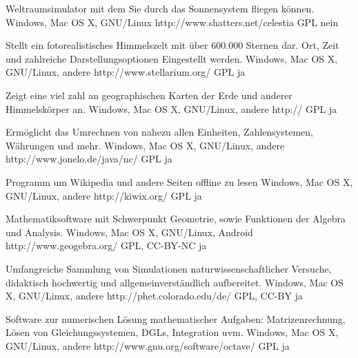 \documentclass[11pt,a4paper,landscape,twocolumn]{article}
\begin{document}


{Weltraumsimulator mit dem Sie durch das Sonnensystem fliegen können.}
{Windows, Mac OS X, GNU/Linux}
{http://www.shatters.net/celestia}
{GPL}
{nein}

{Stellt ein fotorealistisches Himmelszelt mit über 600.000 Sternen dar. Ort, Zeit und zahlreiche Darstellungsoptionen Eingestellt werden.}
{Windows, Mac OS X, GNU/Linux, andere}
{http://www.stellarium.org/}
{GPL}
{ja}

{Zeigt eine viel zahl an geographischen Karten der Erde und anderer Himmelskörper an.}
{Windows, Mac OS X, GNU/Linux, andere}
{http://}
{GPL}
{ja}

{Ermöglicht das Umrechnen von nahezu allen Einheiten, Zahlensystemen, Währungen und mehr.}
{Windows, Mac OS X, GNU/Linux, andere}
{http://www.jonelo.de/java/nc/}
{GPL}
{ja}

\newpage %

{Programm um Wikipedia und andere Seiten offline zu lesen}
{Windows, Mac OS X, GNU/Linux, andere}
{http://kiwix.org/}
{GPL}
{ja}

{Mathematiksoftware mit Schwerpunkt Geometrie, sowie Funktionen der Algebra und Analysis.}
{Windows, Mac OS X, GNU/Linux, Android}
{http://www.geogebra.org/}
{GPL, CC-BY-NC}
{ja}

{Umfangreiche Sammlung von Simulationen naturwissenschaftlicher Versuche, didaktisch hochwertig und allgemeinverständlich aufbereitet.}
{Windows, Mac OS X, GNU/Linux, andere}
{http://phet.colorado.edu/de/}
{GPL, CC-BY}
{ja}

{Software zur numerischen Lösung mathematischer Aufgaben: Matrizenrechnung, Lösen von Gleichungssystemen, DGLs, Integration uvm.}
{Windows, Mac OS X, GNU/Linux, andere}
{http://www.gnu.org/software/octave/}
{GPL}
{ja}
\end{document}
